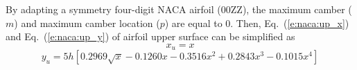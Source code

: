 \documentclass{turgon}
\begin{document}
By adapting a symmetry four-digit NACA airfoil ($\mathrm{00ZZ}$), the
maximum camber ($m$) and maximum camber location ($p$) are equal to $0$.
Then, Eq.~(\ref{e:naca:up_x}) and Eq.~(\ref{e:naca:up_y}) of airfoil upper
surface can be simplified as
\begin{equation}
    x_u = x
    \label{e:naca:up_x_sym}
\end{equation}
\begin{equation}
    y_u = 5h[0.2969\sqrt{x}-0.1260x-0.3516x^2+0.2843x^3-0.1015x^4]
    \label{e:naca:up_y_sym}
\end{equation}

\clearpage
{}


\end{document}
